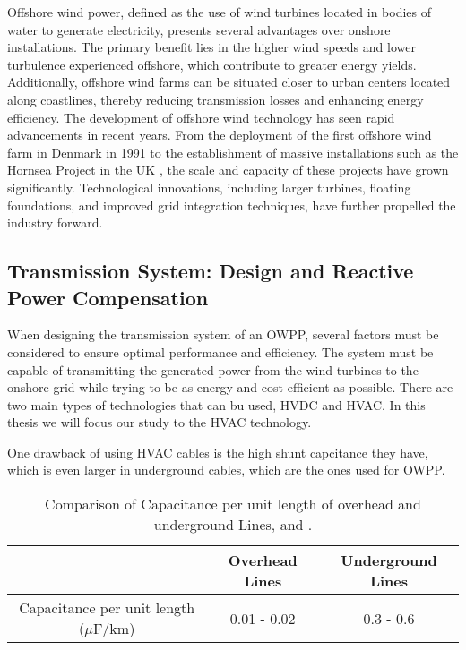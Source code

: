 \documentclass[a4paper,11pt, titlepage, twoside]{article}
\begin{document}
Offshore wind power, defined as the use of wind turbines located in bodies of water to generate electricity, presents several advantages over onshore installations. The primary benefit lies in the higher wind speeds
and lower turbulence experienced offshore, which contribute to greater energy yields. Additionally, offshore wind farms can be situated closer to urban centers located along coastlines, thereby reducing transmission
losses and enhancing energy efficiency. The development of offshore wind technology has seen rapid advancements in recent years. From the deployment of the first offshore wind farm in Denmark in 1991 to the establishment
of massive installations such as the Hornsea Project in the UK \cite{Hornsea}, the scale and capacity of these projects have grown significantly. Technological innovations, including larger turbines, floating foundations, and improved
grid integration techniques, have further propelled the industry forward.

\subsection{Transmission System: Design and Reactive Power Compensation}\label{reactpowpresetation}

When designing the transmission system of an OWPP, several factors must be considered to ensure optimal performance and efficiency. The system must be capable of transmitting the generated power from the wind turbines to the onshore grid
while trying to be as energy and cost-efficient as possible. There are two main types of technologies that can bu used, HVDC and HVAC. In this thesis we will focus our study to the HVAC technology.\par

One drawback of using HVAC cables is the high shunt capcitance they have, which is even larger in underground cables,
which are the ones used for OWPP.

\begin{table}[h]
    \centering
    \begin{tabular}{|c|c|c|}
    \hline
     & Overhead Lines & Underground Lines \\
     \hline
    Capacitance per unit length ($\mu$F/km) & 0.01 - 0.02  & 0.3 - 0.6 \\
    \hline
    \end{tabular}
    \caption{Comparison of Capacitance per unit length of overhead and underground Lines, \cite{ABB} and \cite{overhead}. }
    \label{tab:capacitance_comparison}
    \end{table}
\end{document}

